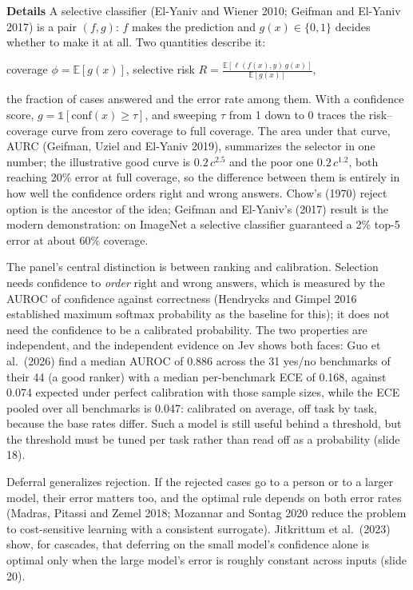 \documentclass[11pt,letterpaper]{article}
\newcommand{\para}[1]{\medskip\noindent\textbf{#1}\quad}
\newenvironment{formulas}{\begin{tcolorbox}[formulabox]}{\end{tcolorbox}}
\begin{document}
\para{Details} A selective classifier (El-Yaniv and Wiener 2010; Geifman and El-Yaniv 2017) is a pair $(f,g)$: $f$ makes the prediction and $g(x)\in\{0,1\}$ decides whether to make it at all. Two quantities describe it:
\begin{formulas}
coverage $\phi=\mathbb E[g(x)]$, \qquad selective risk $\displaystyle R=\frac{\mathbb E[\ell(f(x),y)\,g(x)]}{\mathbb E[g(x)]}$,
\end{formulas}
the fraction of cases answered and the error rate among them. With a confidence score, $g=\mathbb 1[\mathrm{conf}(x)\geq\tau]$, and sweeping $\tau$ from 1 down to 0 traces the risk--coverage curve from zero coverage to full coverage. The area under that curve, AURC (Geifman, Uziel and El-Yaniv 2019), summarizes the selector in one number; the illustrative good curve is $0.2\,c^{2.5}$ and the poor one $0.2\,c^{1.2}$, both reaching 20\% error at full coverage, so the difference between them is entirely in how well the confidence orders right and wrong answers. Chow's (1970) reject option is the ancestor of the idea; Geifman and El-Yaniv's (2017) result is the modern demonstration: on ImageNet a selective classifier guaranteed a 2\% top-5 error at about 60\% coverage.

The panel's central distinction is between ranking and calibration. Selection needs confidence to \emph{order} right and wrong answers, which is measured by the AUROC of confidence against correctness (Hendrycks and Gimpel 2016 established maximum softmax probability as the baseline for this); it does not need the confidence to be a calibrated probability. The two properties are independent, and the independent evidence on Jev shows both faces: Guo et al.\ (2026) find a median AUROC of 0.886 across the 31 yes/no benchmarks of their 44 (a good ranker) with a median per-benchmark ECE of 0.168, against 0.074 expected under perfect calibration with those sample sizes, while the ECE pooled over all benchmarks is 0.047: calibrated on average, off task by task, because the base rates differ. Such a model is still useful behind a threshold, but the threshold must be tuned per task rather than read off as a probability (slide 18).

Deferral generalizes rejection. If the rejected cases go to a person or to a larger model, their error matters too, and the optimal rule depends on both error rates (Madras, Pitassi and Zemel 2018; Mozannar and Sontag 2020 reduce the problem to cost-sensitive learning with a consistent surrogate). Jitkrittum et al.\ (2023) show, for cascades, that deferring on the small model's confidence alone is optimal only when the large model's error is roughly constant across inputs (slide 20).
\end{document}
